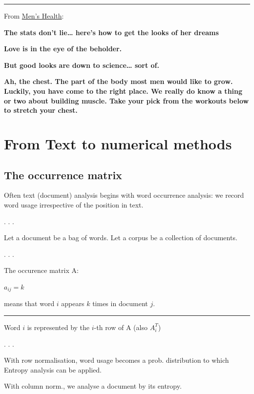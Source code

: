 \documentclass[
  letterpaper,
  DIV=11,
  numbers=noendperiod]{scrartcl}
\begin{document}
\begin{center}\rule{0.5\linewidth}{0.5pt}\end{center}

From
\href{http://www.menshealth.co.uk/healthy/according-to-data-this-is-the-perfect-male-specimen}{Men's
Health}:

\textbf{The stats don't lie\ldots{} here's how to get the looks of her
dreams}

\textbf{Love is in the eye of the beholder.}

\textbf{But good looks are down to science\ldots{} sort of.}

\textbf{Ah, the chest. The part of the body most men would like to grow.
Luckily, you have come to the right place. We really do know a thing or
two about building muscle. Take your pick from the workouts below to
stretch your chest.}

\section{From Text to numerical
methods}\label{from-text-to-numerical-methods}

\subsection{The occurrence matrix}\label{the-occurrence-matrix}

Often text (document) analysis begins with word occurrence analysis: we
record word usage irrespective of the position in text.

. . .

Let a document be a bag of words. Let a corpus be a collection of
documents.

. . .

The occurence matrix A:

\(a_{ij} = k\)

means that word \(i\) appears \(k\) times in document \(j.\)

\begin{center}\rule{0.5\linewidth}{0.5pt}\end{center}

Word \(i\) is represented by the \(i\)-th row of A (also \(A^T_i\))

. . .

With row normalisation, word usage becomes a prob. distribution to which
Entropy analysis can be applied.

With column norm., we analyse a document by its entropy.
\end{document}
